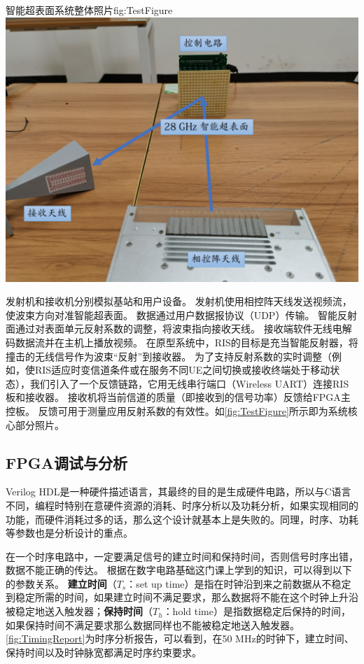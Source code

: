 \documentclass[supercite]{HustGraduPaper}
\begin{document}
\begin{generalfig}[htb]{智能超表面系统整体照片}{fig:TestFigure}
	\includegraphics[width=0.8\linewidth]{Figures/TestFigure.pdf}
\end{generalfig}

发射机和接收机分别模拟基站和用户设备。
发射机使用相控阵天线发送视频流，使波束方向对准智能超表面。
数据通过用户数据报协议（UDP）传输。
智能反射面通过对表面单元反射系数的调整，将波束指向接收天线。
接收端软件无线电解码数据流并在主机上播放视频。
在原型系统中，RIS的目标是充当智能反射器，将撞击的无线信号作为波束“反射”到接收器。
为了支持反射系数的实时调整（例如，使RIS适应时变信道条件或在服务不同UE之间切换或接收终端处于移动状态），我们引入了一个反馈链路，它用无线串行端口（Wireless UART）连接RIS板和接收器。
接收机将当前信道的质量（即接收到的信号功率）反馈给FPGA主控板。
反馈可用于测量应用反射系数的有效性。如\autoref{fig:TestFigure}所示即为系统核心部分照片。

\subsection{FPGA调试与分析}

Verilog HDL是一种硬件描述语言，其最终的目的是生成硬件电路，所以与C语言不同，编程时特别在意硬件资源的消耗、时序分析以及功耗分析，如果实现相同的功能，而硬件消耗过多的话，那么这个设计就基本上是失败的。同理，时序、功耗等参数也是分析设计的重点。

在一个时序电路中，一定要满足信号的建立时间和保持时间，否则信号时序出错，数据不能正确的传达。
根据在数字电路基础这门课上学到的知识，可以得到以下的参数关系。
{\bfseries 建立时间}（$T_s$：set up time）是指在时钟沿到来之前数据从不稳定到稳定所需的时间，如果建立时间不满足要求，那么数据将不能在这个时钟上升沿被稳定地送入触发器；{\bfseries 保持时间}（$T_h$：hold time）是指数据稳定后保持的时间，如果保持时间不满足要求那么数据同样也不能被稳定地送入触发器。
\autoref{fig:TimingReport}为时序分析报告，可以看到，在50 MHz的时钟下，建立时间、保持时间以及时钟脉宽都满足时序约束要求。
\end{document}
